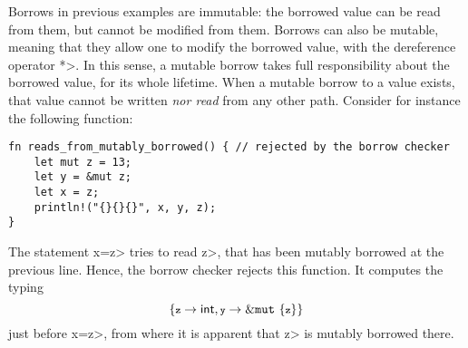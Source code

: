 Borrows in previous examples are immutable: the borrowed value can be read
from them, but cannot be modified from them.
Borrows can also be mutable, meaning that they allow one to modify the
borrowed value, with the dereference operator \<*>. In this sense,
a mutable borrow takes full responsibility about the borrowed value, for its
whole lifetime. When a mutable borrow to a value exists, that value cannot
be written \emph{nor read} from any other path. Consider for instance
the following function:

\begin{verbatim}
fn reads_from_mutably_borrowed() { // rejected by the borrow checker
    let mut z = 13;
    let y = &mut z;
    let x = z;
    println!("{}{}{}", x, y, z);
}
\end{verbatim}

\noindent
The statement \<x=z> tries to read \<z>, that has been mutably borrowed
at the previous line. Hence, the borrow checker rejects this function.
It computes the typing
\[
\{\<z>\to\mathsf{int},\<y>\to\mutborrow\{\<z>\}\}
\]
just before \<x=z>, from where it is apparent that \<z> is mutably borrowed there.

%
%

%
%
